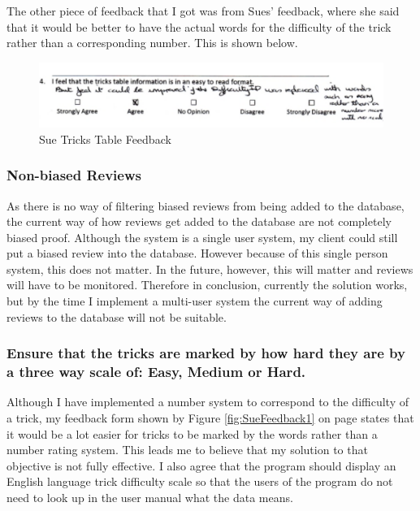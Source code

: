 The other piece of feedback that I got was from Sues' feedback, where she said that it would be better to have the actual words for the difficulty of the trick rather than a corresponding number. This is shown below.

\begin{figure}[H]
    \includegraphics[width=\textwidth]{./Evaluation/images/SueTricks.pdf}
    \caption{Sue Tricks Table Feedback} \label{fig:SueTricksFeedback}
\end{figure}




\subsubsection{Non-biased Reviews}

As there is no way of filtering biased reviews from being added to the database, the current way of how reviews get added to the database are not completely biased proof. Although the system is a single user system, my client could still put a biased review into the database. However because of this single person system, this does not matter. In the future, however, this will matter and reviews will have to be monitored. Therefore in conclusion, currently the solution works, but by the time I implement a multi-user system the current way of adding reviews to the database will not be suitable.

\subsubsection{Ensure that the tricks are marked by how hard they are by a three way scale of: Easy, Medium or Hard.}

Although I have implemented a number system to correspond to the difficulty of a trick, my feedback form shown by Figure \ref{fig:SueFeedback1} on page \pageref{fig:SueFeedback1} states that it would be a lot easier for tricks to be marked by the words rather than a number rating system. This leads me to believe that my solution to that objective is not fully effective. I also agree that the program should display an English language trick difficulty scale so that the users of the program do not need to look up in the user manual what the data means.


